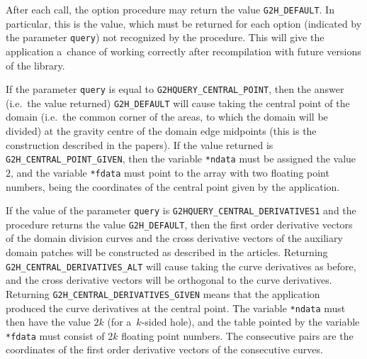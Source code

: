 \vspace{\bigskipamount}
After each call, the option procedure may return the value
\texttt{G2H\_DEFAULT}. In particular, this is the value, which must be returned
for each option (indicated by the parameter \texttt{query}) not recognized
by the procedure. This will give the application a~chance of working
correctly after recompilation with future versions of the library.

If the parameter \texttt{query} is equal to \texttt{G2HQUERY\_CENTRAL\_POINT},
then the answer (i.e.\ the value returned) \texttt{G2H\_DEFAULT} will cause
taking the central point of the domain (i.e.\ the common corner of the
areas, to which the domain will be divided) at the gravity centre of the
domain edge midpoints (this is the construction described in the papers).
If the value returned is \texttt{G2H\_CENTRAL\_POINT\_GIVEN}, then
the variable \texttt{*ndata} must be assigned the value~$2$, and
the variable \texttt{*fdata} must point to the array with two floating point
numbers, being the coordinates of the central point given by the application.

If the value of the parameter \texttt{query} is
\texttt{G2HQUERY\_CENTRAL\_DERIVATIVES1} and the procedure returns the value
\texttt{G2H\_DEFAULT}, then the first order derivative vectors of the domain
division curves and the cross derivative vectors of the auxiliary domain
patches will be constructed as described in the articles.
Returning \texttt{G2H\_CENTRAL\_DERIVATIVES\_ALT} will cause taking
the curve derivatives as before, and the cross derivative vectors will be
orthogonal to the curve derivatives. Returning
\texttt{G2H\_CENTRAL\_DERIVATIVES\_GIVEN} means that the application
produced the curve derivatives at the central point. The variable
\texttt{*ndata} must then have the value $2k$ (for a~$k$-sided hole), and
the table pointed by the variable \texttt{*fdata} must consist of $2k$
floating point numbers. The consecutive pairs are the coordinates of the
first order derivative vectors of the consecutive curves.

